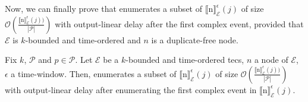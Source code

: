 Now, we can finally prove that  enumerates a subset of ${\llbracket \text{n} \rrbracket}^{\epsilon}_{\mathcal{E}}(j)$ of size $\mathcal{O}(\frac{{\llbracket \text{n} \rrbracket}^{\epsilon}_{\mathcal{E}}(j))}{|\mathcal{P}|})$ with output-linear delay after the first complex event, provided that $\mathcal{E}$ is $k$-bounded and time-ordered and $n$ is a duplicate-free node.

\begin{theorem}\label{theorem:enumeration:process}
  Fix $k$, $\mathcal{P}$ and $p \in \mathcal{P}$. Let $\mathcal{E}$ be a $k$-bounded and time-ordered \acrshort{tecs}, $n$ a node of $\mathcal{E}$, $\epsilon$ a time-window. Then,  enumerates a subset of ${\llbracket \text{n} \rrbracket}^{\epsilon}_{\mathcal{E}}(j)$ of size $\mathcal{O}(\frac{{\llbracket \text{n} \rrbracket}^{\epsilon}_{\mathcal{E}}(j))}{|\mathcal{P}|})$ with output-linear delay after enumerating the first complex event in ${\llbracket \text{n} \rrbracket}^{\epsilon}_{\mathcal{E}}(j)$.
\end{theorem}


